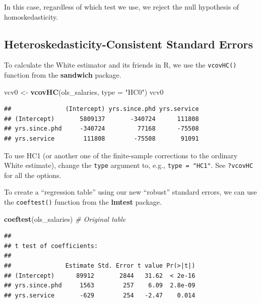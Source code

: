 \documentclass[12pt,oneside,openany]{book}
\newenvironment{Shaded}{\begin{snugshade}}{\end{snugshade}}
\newcommand{\KeywordTok}[1]{\textcolor[rgb]{0.13,0.29,0.53}{\textbf{{#1}}}}
\newcommand{\DataTypeTok}[1]{\textcolor[rgb]{0.13,0.29,0.53}{{#1}}}
\newcommand{\StringTok}[1]{\textcolor[rgb]{0.31,0.60,0.02}{{#1}}}
\newcommand{\CommentTok}[1]{\textcolor[rgb]{0.56,0.35,0.01}{\textit{{#1}}}}
\newcommand{\NormalTok}[1]{{#1}}
\begin{document}
In this case, regardless of which test we use, we reject the null
hypothesis of homoskedasticity.

\subsection{Heteroskedasticity-Consistent Standard
Errors}\label{heteroskedasticity-consistent-standard-errors}

To calculate the White estimator and its friends in R, we use the
\texttt{vcovHC()} function from the \textbf{sandwich} package.

\begin{Shaded}
\begin{Highlighting}[]
\NormalTok{vcv0 <-}\StringTok{ }\KeywordTok{vcovHC}\NormalTok{(ols_salaries, }\DataTypeTok{type =} \StringTok{"HC0"}\NormalTok{)}
\NormalTok{vcv0}
\end{Highlighting}
\end{Shaded}

\begin{verbatim}
##               (Intercept) yrs.since.phd yrs.service
## (Intercept)       5809137       -340724      111808
## yrs.since.phd     -340724         77168      -75508
## yrs.service        111808        -75508       91091
\end{verbatim}

To use HC1 (or another one of the finite-sample corrections to the
ordinary White estimate), change the \texttt{type} argument to, e.g.,
\texttt{type\ =\ "HC1"}. See \texttt{?vcovHC} for all the options.

To create a ``regression table'' using our new ``robust'' standard
errors, we can use the \texttt{coeftest()} function from the
\textbf{lmtest} package.

\begin{Shaded}
\begin{Highlighting}[]
\KeywordTok{coeftest}\NormalTok{(ols_salaries)  }\CommentTok{# Original table}
\end{Highlighting}
\end{Shaded}

\begin{verbatim}
## 
## t test of coefficients:
## 
##               Estimate Std. Error t value Pr(>|t|)
## (Intercept)      89912       2844   31.62  < 2e-16
## yrs.since.phd     1563        257    6.09  2.8e-09
## yrs.service       -629        254   -2.47    0.014
\end{verbatim}
\end{document}
